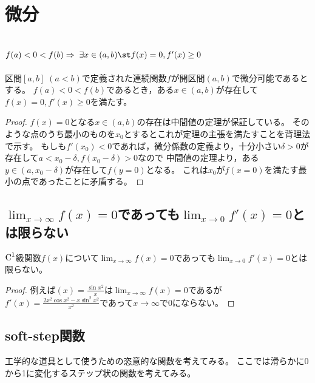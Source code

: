 \chapter{微分}
    \section{\texorpdfstring{$f(a)<0<f(b) \Rightarrow \;\exists x \in (a,b) \st f(x)=0, f'(x)\geq 0$}{f(a)<0<f(b) ⇔ ∃x∈(a,b) s.t. f(x)=0, f'(x)≤0}}
        \begin{shadebox}
            区間$[a,b]\;(a<b)$で定義された連続関数$f$が開区間$(a,b)$で微分可能であるとする。
            $f(a)<0<f(b)$であるとき，ある$x\in(a,b)$が存在して$f(x)=0, f'(x)\geq 0$を満たす。
        \end{shadebox}
    \begin{proof}
        $f(x)=0$となる$x\in(a,b)$の存在は中間値の定理が保証している。
        そのような点のうち最小のものを$x_0$とするとこれが定理の主張を満たすことを背理法で示す。
        もしも$f'(x_0)<0$であれば，微分係数の定義より，十分小さい$\delta>0$が存在して$a<x_0-\delta, f(x_0-\delta)>0$なので
        中間値の定理より，ある$y\in(a,x_0-\delta)$が存在して$f(y=0)$となる。
        これは$x_0$が$f(x=0)$を満たす最小の点であったことに矛盾する。
    \end{proof}
    \section{\texorpdfstring{$\lim_{x\to\infty}{f(x)}=0$}{lim\_\{x→∞\}f(x)=0}であっても\texorpdfstring{$\displaystyle \lim_{x\to0}{f'(x)} = 0$}{lim\_\{x→∞\}f'(x)=0}とは限らない}
        \begin{shadebox}
            $\textup{C}^1$級関数$f(x)$について$\displaystyle \lim_{x\to\infty}{f(x)}=0$であっても$\displaystyle \lim_{x\to0}{f'(x)} = 0$とは限らない。
        \end{shadebox}
        \begin{proof}
            例えば$\displaystyle (x) = \frac{\sin{x^2}}{x}$は$\displaystyle \lim_{x\to\infty}{f(x)}=0$であるが$\displaystyle f'(x) = \frac{2x^2\cos{x^2} - x\sin^2{x^2}}{x^2}$であって$x\to\infty$で0にならない。
        \end{proof}
    \section{soft-step関数}
        工学的な道具として使うための恣意的な関数を考えてみる。
        ここでは滑らかに0から1に変化するステップ状の関数を考えてみる。
